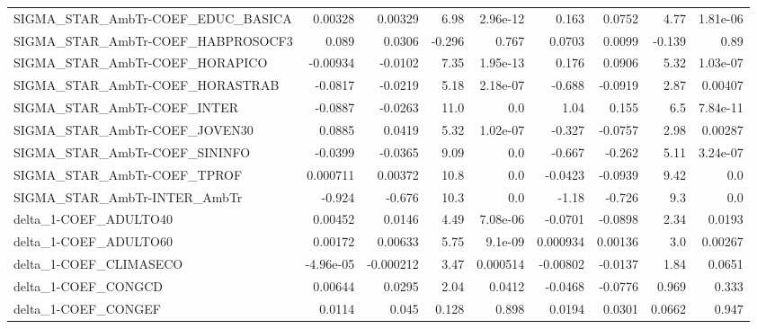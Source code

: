 \begin{tabular}{lrrrrrrrr}
SIGMA\_STAR\_AmbTr-COEF\_EDUC\_BASICA &     0.00328 &      0.00329 &    6.98 & 2.96e-12 &      0.163 &      0.0752 &         4.77 &      1.81e-06 \\
SIGMA\_STAR\_AmbTr-COEF\_HABPROSOCF3 &       0.089 &       0.0306 &  -0.296 &    0.767 &     0.0703 &      0.0099 &       -0.139 &          0.89 \\
SIGMA\_STAR\_AmbTr-COEF\_HORAPICO    &    -0.00934 &      -0.0102 &    7.35 & 1.95e-13 &      0.176 &      0.0906 &         5.32 &      1.03e-07 \\
SIGMA\_STAR\_AmbTr-COEF\_HORASTRAB   &     -0.0817 &      -0.0219 &    5.18 & 2.18e-07 &     -0.688 &     -0.0919 &         2.87 &       0.00407 \\
SIGMA\_STAR\_AmbTr-COEF\_INTER       &     -0.0887 &      -0.0263 &    11.0 &      0.0 &       1.04 &       0.155 &          6.5 &      7.84e-11 \\
SIGMA\_STAR\_AmbTr-COEF\_JOVEN30     &      0.0885 &       0.0419 &    5.32 & 1.02e-07 &     -0.327 &     -0.0757 &         2.98 &       0.00287 \\
SIGMA\_STAR\_AmbTr-COEF\_SININFO     &     -0.0399 &      -0.0365 &    9.09 &      0.0 &     -0.667 &      -0.262 &         5.11 &      3.24e-07 \\
SIGMA\_STAR\_AmbTr-COEF\_TPROF       &    0.000711 &      0.00372 &    10.8 &      0.0 &    -0.0423 &     -0.0939 &         9.42 &           0.0 \\
SIGMA\_STAR\_AmbTr-INTER\_AmbTr      &      -0.924 &       -0.676 &    10.3 &      0.0 &      -1.18 &      -0.726 &          9.3 &           0.0 \\
delta\_1-COEF\_ADULTO40             &     0.00452 &       0.0146 &    4.49 & 7.08e-06 &    -0.0701 &     -0.0898 &         2.34 &        0.0193 \\
delta\_1-COEF\_ADULTO60             &     0.00172 &      0.00633 &    5.75 &  9.1e-09 &   0.000934 &     0.00136 &          3.0 &       0.00267 \\
delta\_1-COEF\_CLIMASECO            &   -4.96e-05 &    -0.000212 &    3.47 & 0.000514 &   -0.00802 &     -0.0137 &         1.84 &        0.0651 \\
delta\_1-COEF\_CONGCD               &     0.00644 &       0.0295 &    2.04 &   0.0412 &    -0.0468 &     -0.0776 &        0.969 &         0.333 \\
delta\_1-COEF\_CONGEF               &      0.0114 &        0.045 &   0.128 &    0.898 &     0.0194 &      0.0301 &       0.0662 &         0.947 \\

\end{tabular}
